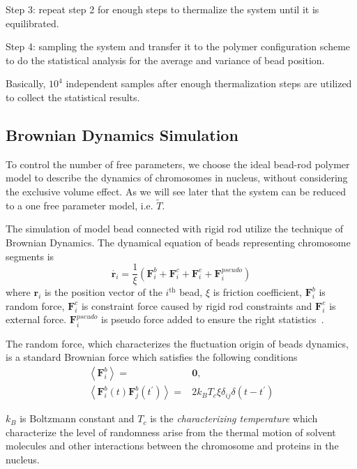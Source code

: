\documentclass{article}
\begin{document}
Step 3: repeat step 2 for enough steps to thermalize the system until it is
equilibrated.

Step 4: sampling the system and transfer it to the polymer configuration scheme
to do the statistical analysis for the average and variance of bead position.

Basically, $10^4$ independent samples after enough thermalization steps are utilized
to collect the statistical results.



\subsection{Brownian Dynamics Simulation}
\label{sub:BDS}
To control the number of free parameters, we choose the ideal bead-rod polymer model to describe the dynamics of chromosomes in nucleus, without considering the exclusive volume effect. 
As we will see later that the system can be reduced to a one free parameter model, i.e. $\tilde{T}$. 

The simulation of model bead connected with rigid rod utilize the technique of Brownian Dynamics\cite{Cruz2012}.
The dynamical equation of beads representing chromosome segments is
\begin{equation}
	\label{eq:differential}
	\dot{\mathbf{r}_i} = \frac{1}{\xi}(\mathbf{F}_i^b + \mathbf{F}_i^c + \mathbf{F}_i^e + \mathbf{F}_i^{pseudo}) 
\end{equation}
where $\mathbf{r}_i$ is the position vector of the $i^{\text{th}}$ bead, $\xi$ is friction coefficient, $\mathbf{F}_i^b$ is random force, $\mathbf{F}_i^c$ is constraint force caused by rigid rod constraints and $\mathbf{F}_i^e$ is external force.
$\mathbf{F}_i^{pseudo}$ is pseudo force added to ensure the right
statistics~\cite{Hinch1994,Cruz2012}.

The random force, which characterizes the fluctuation origin of beads dynamics, is a standard Brownian force which satisfies the following conditions
\begin{subequations}
	\begin{align}
		\left\langle\mathbf{F}_i^b\right\rangle=& \mathbf{0}, \\
		\left\langle\mathbf{F}_i^b (t)\mathbf{F}_j^b (t^{\prime}) \right\rangle=&2k_B T_{c} \xi\delta_{ij}\delta(t-t^{\prime})
	\end{align}
\end{subequations}

$k_B$ is Boltzmann constant and $T_{c}$ is the \emph{characterizing temperature} which characterize the level of randomness arise from the thermal motion of solvent molecules and other interactions between the chromosome and proteins in the nucleus.
\end{document}
